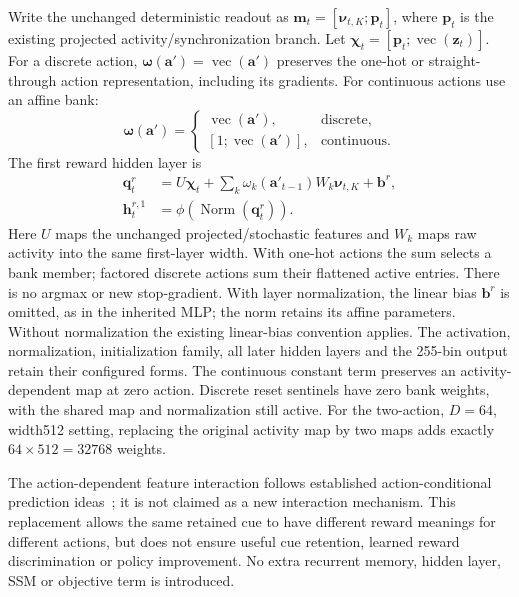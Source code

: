 \documentclass{article}
\begin{document}
Write the unchanged deterministic readout as $\mathbf m_t=[\boldsymbol\nu_{t,K};\mathbf p_t]$, where $\mathbf p_t$ is the existing projected activity/synchronization branch. Let $\boldsymbol\chi_t=[\mathbf p_t;\operatorname{vec}(\mathbf z_t)]$. For a discrete action, $\boldsymbol\omega(\mathbf a')=\operatorname{vec}(\mathbf a')$ preserves the one-hot or straight-through action representation, including its gradients. For continuous actions use an affine bank:
\begin{equation}
\boldsymbol\omega(\mathbf a')=
\begin{cases}
\operatorname{vec}(\mathbf a'),&\text{discrete},\\
[1;\operatorname{vec}(\mathbf a')],&\text{continuous}.
\end{cases}
\label{eq:reward_action_weights}
\end{equation}
The first reward hidden layer is
\begin{equation}
\begin{split}
\mathbf q_t^r&=U\boldsymbol\chi_t+
\sum_k\omega_k(\mathbf a'_{t-1})W_k\boldsymbol\nu_{t,K}
+\mathbf b^r,\\
\mathbf h_t^{r,1}&=\phi\!\left(\operatorname{Norm}(\mathbf q_t^r)\right).
\end{split}
\label{eq:reward_first_layer}
\end{equation}
Here $U$ maps the unchanged projected/stochastic features and $W_k$ maps raw activity into the same first-layer width. With one-hot actions the sum selects a bank member; factored discrete actions sum their flattened active entries. There is no argmax or new stop-gradient. With layer normalization, the linear bias $\mathbf b^r$ is omitted, as in the inherited MLP; the norm retains its affine parameters. Without normalization the existing linear-bias convention applies. The activation, normalization, initialization family, all later hidden layers and the 255-bin output retain their configured forms. The continuous constant term preserves an activity-dependent map at zero action. Discrete reset sentinels have zero bank weights, with the shared map and normalization still active. For the two-action, $D=64$, width512 setting, replacing the original activity map by two maps adds exactly $64\times512=32768$ weights.

The action-dependent feature interaction follows established action-conditional prediction ideas~\cite{oh2015action}; it is not claimed as a new interaction mechanism. This replacement allows the same retained cue to have different reward meanings for different actions, but does not ensure useful cue retention, learned reward discrimination or policy improvement. No extra recurrent memory, hidden layer, SSM or objective term is introduced.
\end{document}
